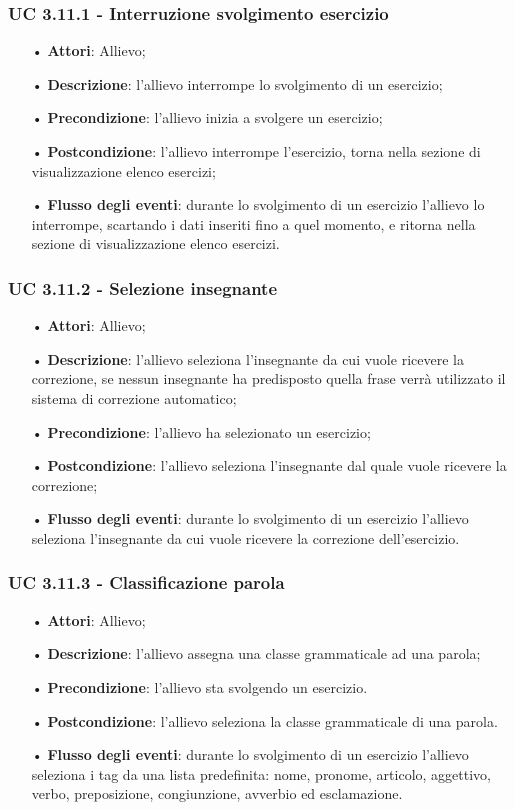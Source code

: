 \subsubsection{UC 3.11.1 - Interruzione svolgimento esercizio}
\begin{itemize}
	\item[•]\textbf{Attori}: Allievo;
	\item[•]\textbf{Descrizione}: l'allievo interrompe lo svolgimento di un esercizio;
	\item[•]\textbf{Precondizione}: l'allievo inizia a svolgere un esercizio;
	\item[•]\textbf{Postcondizione}: l'allievo interrompe l'esercizio, torna nella sezione di visualizzazione elenco esercizi;
	\item[•]\textbf{Flusso degli eventi}: durante lo svolgimento di un esercizio l'allievo lo interrompe, scartando i dati inseriti fino a quel momento, e ritorna nella sezione di visualizzazione elenco esercizi.
\end{itemize}

\subsubsection{UC 3.11.2 - Selezione insegnante}
\begin{itemize}
	\item[•]\textbf{Attori}: Allievo;
	\item[•]\textbf{Descrizione}: l'allievo seleziona l'insegnante da cui vuole ricevere la correzione, se nessun insegnante ha predisposto quella frase verrà utilizzato il sistema di correzione automatico;
	\item[•]\textbf{Precondizione}: l'allievo ha selezionato un esercizio;
	\item[•]\textbf{Postcondizione}: l'allievo seleziona l'insegnante dal quale vuole ricevere la correzione;
	\item[•]\textbf{Flusso degli eventi}: durante lo svolgimento di un esercizio  l'allievo seleziona l'insegnante da cui vuole ricevere la correzione dell'esercizio.
\end{itemize}

\subsubsection{UC 3.11.3 - Classificazione parola}
\begin{itemize}
	\item[•]\textbf{Attori}: Allievo;
	\item[•]\textbf{Descrizione}: l'allievo assegna una classe grammaticale ad una parola;
		\item[•]\textbf{Precondizione}: l'allievo sta svolgendo un esercizio.
	\item[•]\textbf{Postcondizione}: l'allievo seleziona la classe grammaticale di una parola.
	\item[•]\textbf{Flusso degli eventi}: durante lo svolgimento di un esercizio  l'allievo seleziona i tag da una lista predefinita: nome, pronome, articolo, aggettivo, verbo, preposizione, congiunzione, avverbio ed esclamazione.
\end{itemize}


